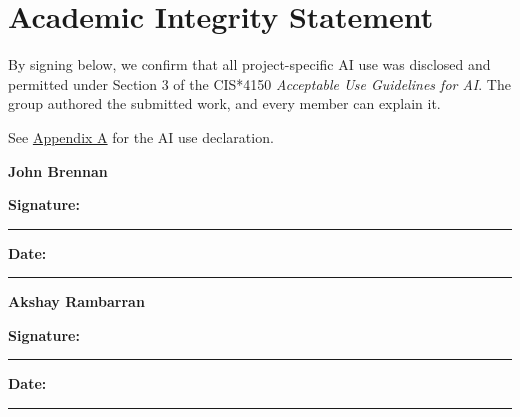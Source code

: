 \section*{Academic Integrity Statement}
\label{sec:academic-integrity}

\noindent
By signing below, we confirm that all project-specific AI use was disclosed
and permitted under Section 3 of the CIS*4150 \textit{Acceptable Use Guidelines
for AI}. The group authored the submitted work, and every member can explain it.

\medskip
\noindent
See \hyperref[app:A]{Appendix A} for the AI use declaration.

\bigskip
\noindent
\textbf{John Brennan}
\par\medskip
\noindent
\textbf{Signature:} \rule{0.36\linewidth}{0.4pt}
\hfill
\textbf{Date:} \rule{0.18\linewidth}{0.4pt}

\bigskip
\noindent
\textbf{Akshay Rambarran}
\par\medskip
\noindent
\textbf{Signature:} \rule{0.36\linewidth}{0.4pt}
\hfill
\textbf{Date:} \rule{0.18\linewidth}{0.4pt}
